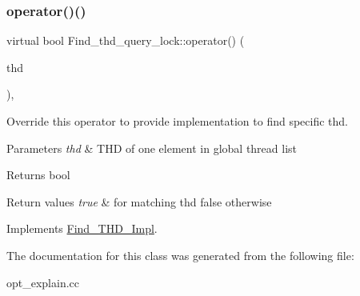 \subsubsection{\texorpdfstring{operator()()}{operator()()}}
{\footnotesize\ttfamily virtual bool Find\+\_\+thd\+\_\+query\+\_\+lock\+::operator() (\begin{DoxyParamCaption}\item[{T\+HD $\ast$}]{thd }\end{DoxyParamCaption})\hspace{0.3cm}{\ttfamily [inline]}, {\ttfamily [virtual]}}

Override this operator to provide implementation to find specific thd.


\begin{DoxyParams}{Parameters}
{\em thd} & T\+HD of one element in global thread list\\
\hline
\end{DoxyParams}
\begin{DoxyReturn}{Returns}
bool 
\end{DoxyReturn}

\begin{DoxyRetVals}{Return values}
{\em true} & for matching thd false otherwise \\
\hline
\end{DoxyRetVals}


Implements \mbox{\hyperlink{classFind__THD__Impl_a9241342847e36bfb0c4d8330df033b4b}{Find\+\_\+\+T\+H\+D\+\_\+\+Impl}}.



The documentation for this class was generated from the following file\+:\begin{DoxyCompactItemize}
\item 
opt\+\_\+explain.\+cc\end{DoxyCompactItemize}
